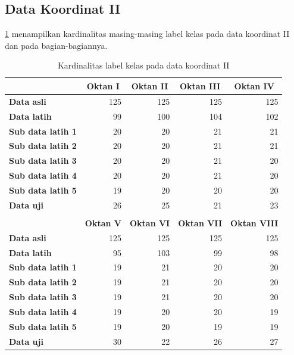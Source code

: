 \subsection{Data Koordinat II}
\noindent \ref{tab: label kelas dk2} menampilkan kardinalitas masing-masing label kelas pada data koordinat II dan pada bagian-bagiannya.
\begin{table}[h!]
  \centering
  \caption{Kardinalitas label kelas pada data koordinat II}
    \begin{tabular}{lrrrr}
    \toprule
          & \multicolumn{1}{c}{\textbf{Oktan I}} & \multicolumn{1}{c}{\textbf{Oktan II}} & \multicolumn{1}{c}{\textbf{Oktan III}} & \multicolumn{1}{c}{\textbf{Oktan IV}} \\
    \midrule
    \textbf{Data asli} & 125   & 125   & 125   & 125 \\
    \textbf{Data latih} & 99    & 100   & 104   & 102 \\
    \textbf{Sub data latih 1} & 20    & 20    & 21    & 21 \\
    \textbf{Sub data latih 2} & 20    & 20    & 21    & 21 \\
    \textbf{Sub data latih 3} & 20    & 20    & 21    & 20 \\
    \textbf{Sub data latih 4} & 20    & 20    & 21    & 20 \\
    \textbf{Sub data latih 5} & 19    & 20    & 20    & 20 \\
    \textbf{Data uji} & 26    & 25    & 21    & 23 \\
    \midrule
          &       &       &       &  \\
    \midrule
          & \multicolumn{1}{c}{\textbf{Oktan V}} & \multicolumn{1}{c}{\textbf{Oktan VI}} & \multicolumn{1}{c}{\textbf{Oktan VII}} & \multicolumn{1}{c}{\textbf{Oktan VIII}} \\
    \midrule
    \textbf{Data asli} & 125   & 125   & 125   & 125 \\
    \textbf{Data latih} & 95    & 103   & 99    & 98 \\
    \textbf{Sub data latih 1} & 19    & 21    & 20    & 20 \\
    \textbf{Sub data latih 2} & 19    & 21    & 20    & 20 \\
    \textbf{Sub data latih 3} & 19    & 21    & 20    & 20 \\
    \textbf{Sub data latih 4} & 19    & 20    & 20    & 19 \\
    \textbf{Sub data latih 5} & 19    & 20    & 19    & 19 \\
    \textbf{Data uji} & 30    & 22    & 26    & 27 \\
    \bottomrule
    \end{tabular}%
    \label{tab: label kelas dk2}
\end{table}

